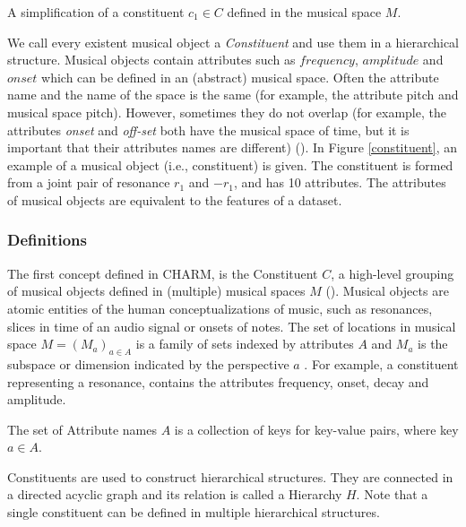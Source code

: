 \begin{marginfigure}
\centering

\caption{A simplification of a constituent $c_1 \in C$ defined in the musical space $M$.}
\label{constituent} 
\end{marginfigure}


We call every existent musical object a \textit{Constituent} and use them in a hierarchical structure. Musical objects contain attributes such as $frequency$, $amplitude$ and $onset$ which can be defined in an (abstract) musical space. Often the attribute name and the name of the space is the same (for example, the attribute pitch and musical space pitch). However, sometimes they do not overlap (for example, the attributes \textit{onset} and \textit{off-set} both have the musical space of time, but it is important that their attributes names are different) (\cite{harley_abstract_2020}). In Figure \ref{constituent}, an example of a musical object (i.e., constituent) is given. The constituent is formed from a joint pair of resonance $r_1$ and $-r_1$, and has 10 attributes. The attributes of musical objects are equivalent to the features of a dataset.




\subsubsection{Definitions}

The first concept defined in CHARM, is the Constituent $C$, a high-level grouping of musical objects defined in (multiple) musical spaces $M$ (\cite{wiggins_representing_1989}). Musical objects are atomic entities of the human conceptualizations of music, such as resonances, slices in time of an audio signal or onsets of notes. The set of locations in musical space $M = (M_a)_{a \in A}$ is a family of sets indexed by attributes $A$ and $M_a$ is the subspace or dimension indicated by the perspective $a$ \parencite[p. 111]{harley_abstract_2020}. For example, a constituent representing a resonance, contains the attributes frequency, onset, decay and amplitude. 
\begin{theorem}[Attribute]
\label{Attribute}
The set of Attribute names $A$ is a collection of keys for key-value pairs, where key $a \in A$.
\end{theorem}

Constituents are used to construct hierarchical structures. They are connected in a directed acyclic graph and its relation is called a Hierarchy $H$. Note that a single constituent can be defined in multiple hierarchical structures.


